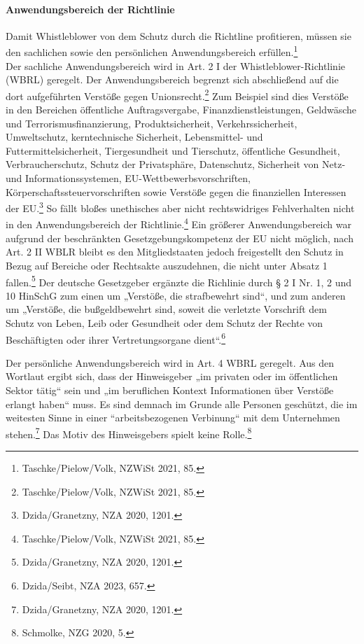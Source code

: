 \paragraph{Anwendungsbereich der Richtlinie}
Damit Whistleblower von dem Schutz durch die Richtline profitieren, müssen sie den sachlichen sowie den persönlichen Anwendungsbereich erfüllen.\footnote{Taschke/Pielow/Volk, NZWiSt 2021, 85.}\\
Der sachliche Anwendungsbereich wird in Art. 2 I der Whistleblower-Richtlinie (WBRL) geregelt. 
Der Anwendungsbereich begrenzt sich abschließend auf die dort aufgeführten Verstöße gegen Unionsrecht.\footnote{Taschke/Pielow/Volk, NZWiSt 2021, 85.}
Zum Beispiel sind dies Verstöße in den Bereichen öffentliche Auftragsvergabe, Finanzdienstleistungen, Geldwäsche und Terrorismusfinanzierung, Produktsicherheit, Verkehrssicherheit, Umweltschutz, kerntechnische Sicherheit, Lebensmittel- und Futtermittelsicherheit, Tiergesundheit und Tierschutz, öffentliche Gesundheit, Verbraucherschutz, Schutz der Privatsphäre, Datenschutz, Sicherheit von Netz- und Informationssystemen, EU-Wettbewerbsvorschriften, Körperschaftssteuervorschriften sowie Verstöße gegen die finanziellen Interessen der EU.\footnote{Dzida/Granetzny, NZA 2020, 1201.}
So fällt bloßes unethisches aber nicht rechtswidriges Fehlverhalten nicht in den Anwendungsbereich der Richtlinie.\footnote{Taschke/Pielow/Volk, NZWiSt 2021, 85.}
Ein größerer Anwendungsbereich war aufgrund der beschränkten Gesetzgebungskompetenz der EU nicht möglich, nach Art. 2 II WBLR bleibt es den Mitgliedstaaten jedoch freigestellt den Schutz in Bezug auf Bereiche oder Rechtsakte auszudehnen, die nicht unter Absatz 1 fallen.\footnote{Dzida/Granetzny, NZA 2020, 1201.}
Der deutsche Gesetzgeber ergänzte die Richlinie durch § 2 I Nr. 1, 2 und 10 HinSchG zum einen um „Verstöße, die strafbewehrt sind“, und zum anderen um „Verstöße, die bußgeldbewehrt sind, soweit die verletzte Vorschrift dem Schutz von Leben, Leib oder Gesundheit oder dem Schutz der Rechte von Beschäftigten oder ihrer Vertretungsorgane dient“.\footnote{Dzida/Seibt, NZA 2023, 657.}

\bigbreak

Der persönliche Anwendungsbereich wird in Art. 4 WBRL geregelt.
Aus den Wortlaut ergibt sich, dass der Hinweisgeber „im privaten oder im öffentlichen Sektor tätig“ sein und „im beruflichen Kontext Informationen über Verstöße erlangt haben“ muss.
Es sind demnach im Grunde alle Personen geschützt, die im weitesten Sinne in einer “arbeitsbezogenen Verbinung“ mit dem Unternehmen stehen.\footnote{Dzida/Granetzny, NZA 2020, 1201.}
Das Motiv des Hinweisgebers spielt keine Rolle.\footnote{Schmolke, NZG 2020, 5.}


